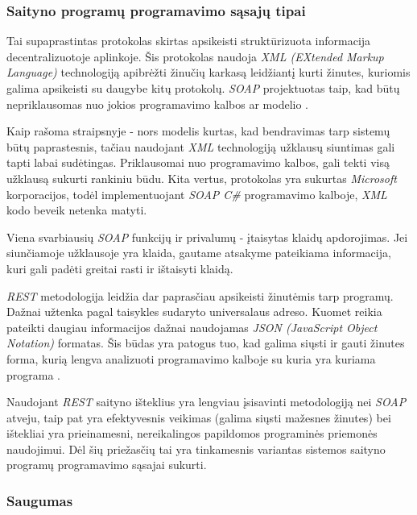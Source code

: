 \documentclass{VUMIFPSkursinis}
\begin{document}
\subsubsection{Saityno programų programavimo sąsajų tipai}


Tai supaprastintas protokolas skirtas apsikeisti struktūrizuota informacija decentralizuotoje aplinkoje. Šis protokolas naudoja \textit{XML (EXtended Markup Language)} technologiją apibrėžti žinučių karkasą leidžiantį kurti žinutes, kuriomis galima apsikeisti su daugybe kitų protokolų. \textit{SOAP} projektuotas taip, kad būtų nepriklausomas nuo jokios programavimo kalbos ar modelio \cite{SoapDocs}.

Kaip rašoma straipsnyje \cite{SoapRest} - nors modelis kurtas, kad bendravimas tarp sistemų būtų paprastesnis, tačiau naudojant \textit{XML} technologiją užklausų siuntimas gali tapti labai sudėtingas. Priklausomai nuo programavimo kalbos, gali tekti visą užklausą sukurti rankiniu būdu. Kita vertus, protokolas yra sukurtas \textit{Microsoft} korporacijos, todėl implementuojant \textit{SOAP C\#} programavimo kalboje, \textit{XML} kodo beveik netenka matyti.

Viena svarbiausių \textit{SOAP} funkcijų ir privalumų - įtaisytas klaidų apdorojimas. Jei siunčiamoje užklausoje yra klaida, gautame atsakyme pateikiama informacija, kuri gali padėti greitai rasti ir ištaisyti klaidą.


\textit{REST} metodologija leidžia dar paprasčiau apsikeisti žinutėmis tarp programų. Dažnai užtenka pagal taisykles sudaryto universalaus adreso. Kuomet reikia pateikti daugiau informacijos dažnai naudojamas \textit{JSON (JavaScript Object Notation)} formatas. Šis būdas yra patogus tuo, kad galima siųsti ir gauti žinutes forma, kurią lengva analizuoti programavimo kalboje su kuria yra kuriama programa \cite{SoapRest}.

Naudojant \textit{REST} saityno išteklius yra lengviau įsisavinti metodologiją nei \textit{SOAP} atveju, taip pat yra efektyvesnis veikimas (galima siųsti mažesnes žinutes) bei ištekliai yra prieinamesni, nereikalingos papildomos programinės priemonės naudojimui. Dėl šių priežasčių tai yra tinkamesnis variantas sistemos saityno programų programavimo sąsajai sukurti.

\subsubsection{Saugumas}
\end{document}
